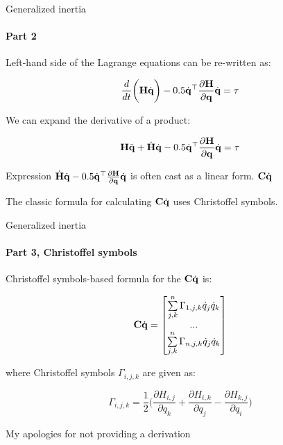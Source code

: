 \documentclass{beamer}
\begin{document}
\begin{frame}{Generalized inertia}
\framesubtitle{Part 2}
\begin{flushleft}

Left-hand side of the Lagrange equations can be re-written as:

\begin{equation}
    \frac{d}{dt} \bigg( 
    \mathbf{H} \dot{\mathbf{q}}
    \bigg) - 
    0.5 \dot{\mathbf{q}}^\top \frac{\partial \mathbf{H} }
     {\partial \mathbf{q}} \dot{\mathbf{q}} = \tau
\end{equation}

We can expand the derivative of a product:

\begin{equation}
\label{Lagrange_expanded}
    \mathbf{H} \ddot{\mathbf{q}} + \dot{\mathbf{H}} \dot{\mathbf{q}} - 
    0.5 \dot{\mathbf{q}}^\top \frac{\partial \mathbf{H} }
     {\partial \mathbf{q}} \dot{\mathbf{q}} = \tau
\end{equation}

Expression $\dot{\mathbf{H}} \dot{\mathbf{q}} - 
    0.5 \dot{\mathbf{q}}^\top \frac{\partial \mathbf{H} }
     {\partial \mathbf{q}} \dot{\mathbf{q}}$ is often cast as a linear form. $\mathbf{C}\dot{\mathbf{q}}$

The classic formula for calculating $\mathbf{C}\dot{\mathbf{q}}$ uses Christoffel symbols.

\end{flushleft}
\end{frame}


\begin{frame}{Generalized inertia}
\framesubtitle{Part 3, Christoffel symbols}
\begin{flushleft}

Christoffel symbols-based formula for the $\mathbf{C}\dot{\mathbf{q}}$ is:

\begin{equation}
    \mathbf{C}\dot{\mathbf{q}} = 
    \begin{bmatrix}
        \sum\limits_{j,k}^{n} \Gamma_{1,j,k} \dot{q}_j \dot{q}_k \\
        ... \\
        \sum\limits_{j,k}^{n} \Gamma_{n,j,k} \dot{q}_j \dot{q}_k
    \end{bmatrix}
\end{equation}

where Christoffel symbols $\Gamma_{i,j,k}$ are given as:

\begin{equation}
\Gamma_{i,j,k} = \frac{1}{2} 
\bigg( 
\frac{\partial H_{i,j} }{\partial q_k} + 
\frac{\partial H_{i,k} }{\partial q_j} - 
\frac{\partial H_{k,j} }{\partial q_i}
\bigg)
\end{equation}

\tiny{My apologies for not providing a derivation}

\end{flushleft}
\end{frame}
\end{document}
